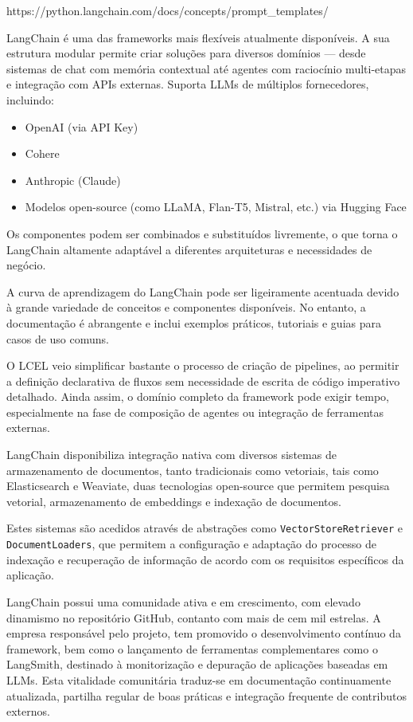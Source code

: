 https://python.langchain.com/docs/concepts/prompt\_templates/


LangChain é uma das frameworks mais flexíveis atualmente disponíveis. A sua estrutura modular permite criar soluções para diversos domínios — desde sistemas de chat com memória contextual até agentes com raciocínio multi-etapas e integração com APIs externas. Suporta LLMs de múltiplos fornecedores, incluindo:

\begin{itemize} \item OpenAI (via API Key) \item Cohere \item Anthropic (Claude) \item Modelos open-source (como LLaMA, Flan-T5, Mistral, etc.) via Hugging Face \end{itemize}

Os componentes podem ser combinados e substituídos livremente, o que torna o LangChain altamente adaptável a diferentes arquiteturas e necessidades de negócio.



A curva de aprendizagem do LangChain pode ser ligeiramente acentuada devido à grande variedade de conceitos e componentes disponíveis. No entanto, a documentação é abrangente e inclui exemplos práticos, tutoriais e guias para casos de uso comuns.

O LCEL veio simplificar bastante o processo de criação de pipelines, ao permitir a definição declarativa de fluxos sem necessidade de escrita de código imperativo detalhado. Ainda assim, o domínio completo da framework pode exigir tempo, especialmente na fase de composição de agentes ou integração de ferramentas externas.


LangChain disponibiliza integração nativa com diversos sistemas de armazenamento de documentos, tanto tradicionais como vetoriais, tais como Elasticsearch e Weaviate, duas tecnologias open-source que permitem pesquisa vetorial, armazenamento de embeddings e indexação de documentos.

Estes sistemas são acedidos através de abstrações como \texttt{VectorStoreRetriever} e \texttt{DocumentLoaders}, que permitem a configuração e adaptação do processo de indexação e recuperação de informação de acordo com os requisitos específicos da aplicação.


LangChain possui uma comunidade ativa e em crescimento, com elevado dinamismo no repositório GitHub, contanto com mais de cem mil estrelas. A empresa responsável pelo projeto, tem promovido o desenvolvimento contínuo da framework, bem como o lançamento de ferramentas complementares como o LangSmith, destinado à monitorização e depuração de aplicações baseadas em LLMs. Esta vitalidade comunitária traduz-se em documentação continuamente atualizada, partilha regular de boas práticas e integração frequente de contributos externos.


